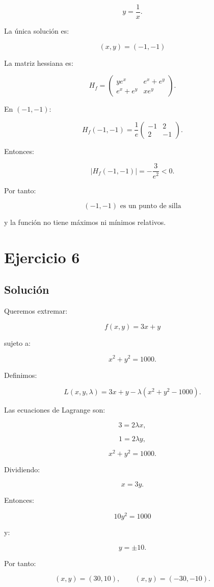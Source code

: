 \documentclass[11pt,a4paper]{article}
\begin{document}
\[
y=\frac1x.
\]

La única solución es:

\[
\boxed{
(x,y)=(-1,-1)
}
\]

La matriz hessiana es:

\[
H_f=
\begin{pmatrix}
ye^x&e^x+e^y\\
e^x+e^y&xe^y
\end{pmatrix}.
\]

En \((-1,-1)\):

\[
H_f(-1,-1)
=
\frac1e
\begin{pmatrix}
-1&2\\
2&-1
\end{pmatrix}.
\]

Entonces:

\[
|H_f(-1,-1)|
=
-\frac3{e^2}<0.
\]

Por tanto:

\[
\boxed{
(-1,-1)\text{ es un punto de silla}
}
\]

y la función no tiene máximos ni mínimos relativos.

\section{Ejercicio 6}
\subsection{Solución}

Queremos extremar:

\[
f(x,y)=3x+y
\]

sujeto a:

\[
x^2+y^2=1000.
\]

Definimos:

\[
L(x,y,\lambda)
=
3x+y-\lambda(x^2+y^2-1000).
\]

Las ecuaciones de Lagrange son:

\[
3=2\lambda x,
\]

\[
1=2\lambda y,
\]

\[
x^2+y^2=1000.
\]

Dividiendo:

\[
x=3y.
\]

Entonces:

\[
10y^2=1000
\]

y:

\[
y=\pm10.
\]

Por tanto:

\[
(x,y)=(30,10),
\qquad
(x,y)=(-30,-10).
\]
\end{document}
